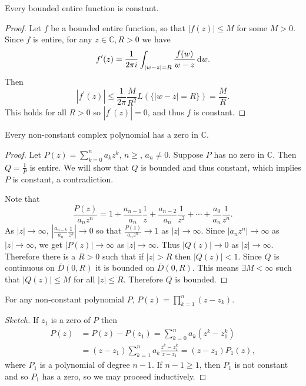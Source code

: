 \begin{theorem}
Every bounded entire function is constant.
\end{theorem}
\begin{proof}
Let $f$ be a bounded entire function, so that $|f(z)| \leq M$ for
some $M > 0$. Since $f$ is entire, for any $z \in \mathbb{C}, R > 0$
we have
$$
f^\prime(z)
=
\frac{1}{2 \pi i}
\int_{|w - z| = R}
  \frac{f(w)}{w - z}
  \mathop{}\!\mathrm{d} w.
$$
Then
$$
|f^\prime(z)|
\leq
\frac{1}{2 \pi}\frac{M}{R^2}
L(\{|w - z| = R\})
= \frac{M}{R}.
$$
This holds for all $R > 0$ so $|f^\prime(z)| = 0$, and thus
$f$ is constant.
\end{proof}

\begin{theorem}
Every non-constant complex polynomial has a zero in $\mathbb{C}$.
\end{theorem}

\begin{proof}
Let $P(z) = \sum_{k=0}^n a_k z^k$, $n \geq $, $a_n \neq 0$. Suppose
$P$ has no zero in $\mathbb{C}$. Then $Q = \frac{1}{P}$ is entire.
We will show that $Q$ is bounded and thus constant, which implies $P$
is constant, a contradiction.

Note that
$$
\frac{P(z)}{a_n z^n}
=
  1
+ \frac{a_{n-1}}{a_n} \frac{1}{z}
+ \frac{a_{n-2}}{a_n} \frac{1}{z^2}
+ \cdots
+ \frac{a_0}{a_n}    \frac{1}{z^n}.
$$
As $|z| \to \infty$,
$\left|\frac{a_{n-k}}{a_n}\frac{1}{z^k}\right| \to 0$
so that $\frac{P(z)}{a_n z^n} \to 1$ as $|z| \to \infty$.
Since $|a_n z^n| \to \infty$ as $|z| \to \infty$, we get
$|P(z)| \to \infty$ as $|z| \to \infty$. Thus $|Q(z)| \to 0$
as $|z| \to \infty$. Therefore there is a $R > 0$ such that
if $|z| > R$ then $|Q(z)| < 1$. Since $Q$ is continuous on
$\bar{D}(0, R)$ it is bounded on $\bar{D}(0, R)$. This means
$\exists M < \infty$ such that $|Q(z)| \leq M$ for all $|z| \leq R$.
Therefore $Q$ is bounded.
\end{proof}

\begin{corol}
For any non-constant polynomial $P$, $P(z) = \prod_{k=1}^n (z - z_k)$.
\end{corol}
\begin{proof}[Sketch]
If $z_1$ is a zero of $P$ then
\begin{align*}
P(z)
&=
   P(z) - P(z_1)
 = \sum_{k=0}^n a_k (z^k - z_1^k) \\
&= (z - z_1) \sum_{k=1}^n a_k \frac{z^k - z_1^k}{z - z_1}
 = (z - z_1) P_1(z),
\end{align*}
where $P_1$ is a polynomial of degree $n-1$. If $n - 1 \geq 1$, then
$P_1$ is not constant and so $P_1$ has a zero, so we may proceed inductively.
\end{proof}
